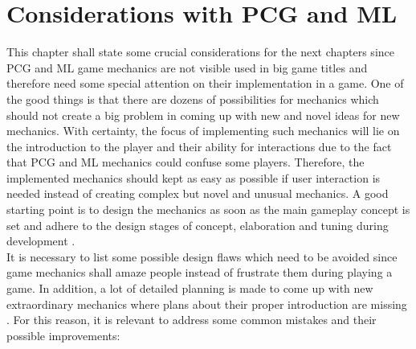 \documentclass[MGS,Master,english]{twbook}%
\begin{document}
\section{Considerations with \acl{PCG} and \acl{ML}} \label{mechanicsConsiderationsPCGandML}
This chapter shall state some crucial considerations for the next chapters since \ac{PCG} and \ac{ML} game mechanics are not visible used in big game titles and therefore need some special attention on their implementation in a game. One of the good things is that there are dozens of possibilities for mechanics which should not create a big problem in coming up with new and novel ideas for new mechanics. With certainty, the focus of implementing such mechanics will lie on the introduction to the player and their ability for interactions due to the fact that PCG and ML mechanics could confuse some players. Therefore, the implemented mechanics should kept as easy as possible if user interaction is needed instead of creating complex but novel and unusual mechanics. A good starting point is to design the mechanics as soon as the main gameplay concept is set and adhere to the design stages of concept, elaboration and tuning during development \cite{gameDesign::gameMechanicsAdvancedGameDesign}.\\
It is necessary to list some possible design flaws which need to be avoided since game mechanics shall amaze people instead of frustrate them during playing a game. In addition, a lot of detailed planning is made to come up with new extraordinary mechanics where plans about their proper introduction are missing \cite{mechanic::gamasutra::MaxPears}. For this reason, it is relevant to address some common mistakes and their possible improvements:
\end{document}
